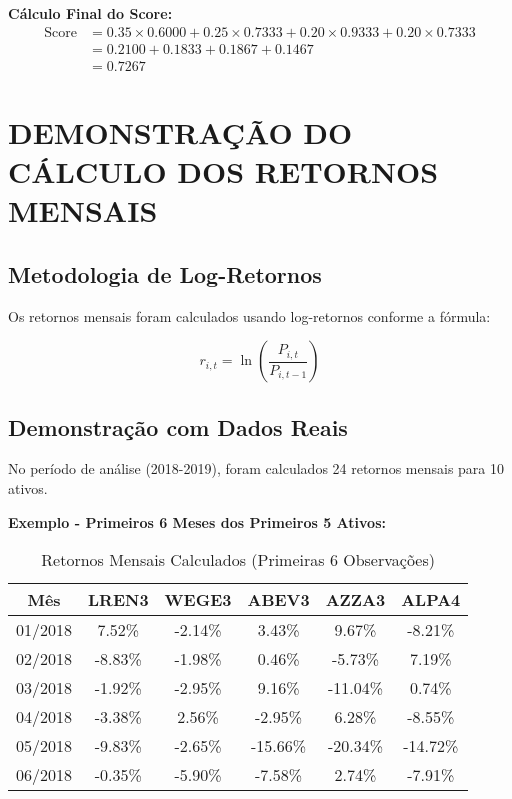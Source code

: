 \textbf{Cálculo Final do Score:}
\begin{align}
\text{Score} &= 0.35 \times 0.6000 + 0.25 \times 0.7333 + 0.20 \times 0.9333 + 0.20 \times 0.7333 \\
&= 0.2100 + 0.1833 + 0.1867 + 0.1467 \\
&= 0.7267
\end{align}

\section{DEMONSTRAÇÃO DO CÁLCULO DOS RETORNOS MENSAIS}

\subsection{Metodologia de Log-Retornos}

Os retornos mensais foram calculados usando log-retornos conforme a fórmula:

\begin{equation}
r_{i,t} = \ln\left(\frac{P_{i,t}}{P_{i,t-1}}\right)
\end{equation}

\subsection{Demonstração com Dados Reais}

No período de análise (2018-2019), foram calculados 24 retornos mensais para 10 ativos.

\textbf{Exemplo - Primeiros 6 Meses dos Primeiros 5 Ativos:}

\begin{table}[H]
\centering
\caption{Retornos Mensais Calculados (Primeiras 6 Observações)}
\scriptsize
\begin{tabular}{|c|c|c|c|c|c|}
\hline
\textbf{Mês} & \textbf{LREN3} & \textbf{WEGE3} & \textbf{ABEV3} & \textbf{AZZA3} & \textbf{ALPA4} \\
\hline
01/2018 & 7.52\% & -2.14\% & 3.43\% & 9.67\% & -8.21\% \\
02/2018 & -8.83\% & -1.98\% & 0.46\% & -5.73\% & 7.19\% \\
03/2018 & -1.92\% & -2.95\% & 9.16\% & -11.04\% & 0.74\% \\
04/2018 & -3.38\% & 2.56\% & -2.95\% & 6.28\% & -8.55\% \\
05/2018 & -9.83\% & -2.65\% & -15.66\% & -20.34\% & -14.72\% \\
06/2018 & -0.35\% & -5.90\% & -7.58\% & 2.74\% & -7.91\% \\
\hline
\end{tabular}
\end{table}

